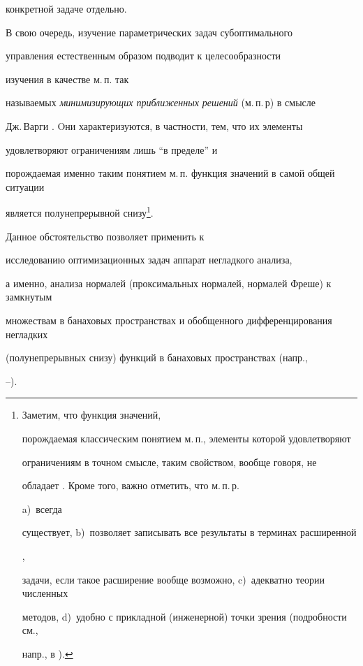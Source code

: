 конкретной задаче отдельно.





В свою очередь, изучение параметрических задач субоптимального


управления естественным образом подводит к целесообразности


изучения в качестве м.\,п. так


называемых {\it минимизирующих приближенных решений} (м.\,п.\,р) в смысле


Дж.\,Варги \cite{warga}. Oни характеризуются, в частности, тем, что их элементы


удовлетворяют ограничениям лишь ``в пределе'' и


порождаемая именно таким понятием м.\,п. функция значений в самой общей ситуации


является полунепрерывной снизу\footnote{Заметим, что функция значений,


порождаемая классическим понятием м.\,п., элементы которой удовлетворяют


ограничениям в точном смысле, таким свойством, вообще говоря, не


обладает \cite{sumin97a}. Кроме того, важно отметить, что м.\,п.\,р. 


a)~всегда


существует, b)~позволяет записывать все результаты в терминах расширенной


\cite{gam77}, \cite{warga}


задачи, если такое расширение вообще возможно, c)~адекватно теории численных


методов, d)~удобно с прикладной (инженерной) точки зрения (подробности см.,


напр., в \cite{warga}).}.




Данное обстоятельство позволяет применить к


исследованию оптимизационных задач аппарат негладкого анализа,


а именно, анализа нормалей (проксимальных нормалей, нормалей Фреше) к замкнутым


множествам в банаховых пространствах и обобщенного дифференцирования негладких


(полунепрерывных снизу) функций в банаховых пространствах (напр.,


\cite{clarke}--\cite{mordukh}).





